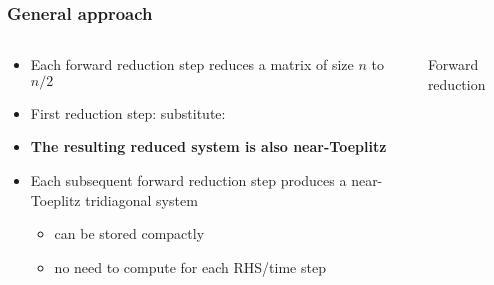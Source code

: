 \begin{frame}
\frametitle{General approach}
\begin{columns}
\begin{column}{0.5\textwidth}
\begin{itemize}
\item Each forward reduction step reduces
    a matrix of size $n$ to $n/2$
\item {First reduction step: substitute:
    }
\item \textbf{The resulting reduced system is also near-Toeplitz}
\item Each subsequent forward reduction step produces a near-Toeplitz
    tridiagonal system
\begin{itemize}
    \item can be stored compactly
    \item no need to compute for each RHS/time step
\end{itemize}
\end{itemize}
\end{column}
\begin{column}{0.5\textwidth}
\centering
Forward reduction
\end{column}
\end{columns}
\end{frame}

